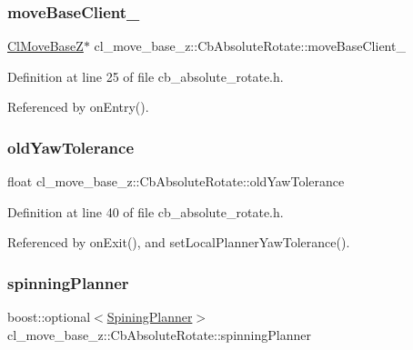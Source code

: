 \subsubsection{\texorpdfstring{move\+Base\+Client\+\_\+}{moveBaseClient\_}}
{\footnotesize\ttfamily \hyperlink{classcl__move__base__z_1_1ClMoveBaseZ}{Cl\+Move\+BaseZ}$\ast$ cl\+\_\+move\+\_\+base\+\_\+z\+::\+Cb\+Absolute\+Rotate\+::move\+Base\+Client\+\_\+}



Definition at line 25 of file cb\+\_\+absolute\+\_\+rotate.\+h.



Referenced by on\+Entry().

\mbox{\label{classcl__move__base__z_1_1CbAbsoluteRotate_a2cfcd2978e7923494e2e66107e134e27}} 
\subsubsection{\texorpdfstring{old\+Yaw\+Tolerance}{oldYawTolerance}}
{\footnotesize\ttfamily float cl\+\_\+move\+\_\+base\+\_\+z\+::\+Cb\+Absolute\+Rotate\+::old\+Yaw\+Tolerance\hspace{0.3cm}{\ttfamily [private]}}



Definition at line 40 of file cb\+\_\+absolute\+\_\+rotate.\+h.



Referenced by on\+Exit(), and set\+Local\+Planner\+Yaw\+Tolerance().

\mbox{\label{classcl__move__base__z_1_1CbAbsoluteRotate_a17d836524599af072cf2e3488e491a91}} 
\subsubsection{\texorpdfstring{spinning\+Planner}{spinningPlanner}}
{\footnotesize\ttfamily boost\+::optional$<$\hyperlink{classcl__move__base__z_1_1CbAbsoluteRotate_ab8d45e43594a3fc6a71c08f07b5dbef0}{Spining\+Planner}$>$ cl\+\_\+move\+\_\+base\+\_\+z\+::\+Cb\+Absolute\+Rotate\+::spinning\+Planner}




